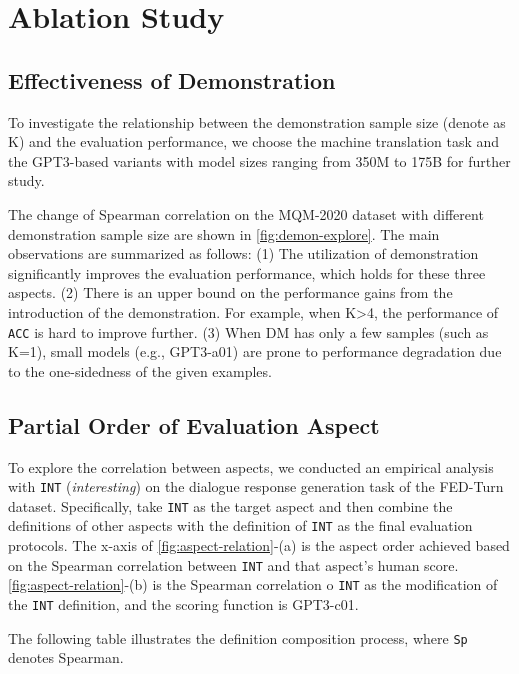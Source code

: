 \section{Ablation Study}

\subsection{Effectiveness of Demonstration}

To investigate the relationship between the demonstration sample size (denote as K) and the evaluation performance, we choose the machine translation task and the GPT3-based variants with model sizes ranging from 350M to 175B for further study.

The change of Spearman correlation on the MQM-2020 dataset with different demonstration sample size are shown in \autoref{fig:demon-explore}.
The main observations are summarized as follows: (1) The utilization of demonstration significantly improves the evaluation performance, which holds for these three aspects. (2) There is an upper bound on the performance gains from the introduction of the demonstration. For example, when K>4, the performance of \texttt{ACC} is hard to improve further. (3) When DM has only a few samples (such as K=1), small models (e.g., GPT3-a01) are prone to performance degradation due to the one-sidedness of the given examples.

\subsection{Partial Order of Evaluation Aspect}
\label{sec:partial-order}
To explore the correlation between aspects, we conducted an empirical analysis with \texttt{INT} ({\textit{interesting}}) on the dialogue response generation task of the FED-Turn dataset. Specifically, take \texttt{INT} as the target aspect and then combine the definitions of other aspects with the definition of \texttt{INT} as the final evaluation protocols. The x-axis of \autoref{fig:aspect-relation}-(a) is the aspect order achieved based on the Spearman correlation between \texttt{INT} and that aspect's human score.
\autoref{fig:aspect-relation}-(b) is the Spearman correlation o \texttt{INT} as the modification of the \texttt{INT} definition, and the scoring function is GPT3-c01.

The following table illustrates the definition composition process, where \texttt{Sp} denotes Spearman.

